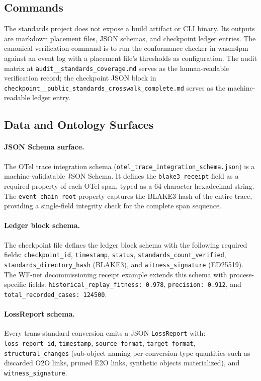 \subsection{Commands}
\label{sec:standards-impl-commands}

The standards project does not expose a build artifact or CLI binary. Its outputs are
markdown placement files, JSON schemas, and checkpoint ledger entries. The canonical
verification command is to run the conformance checker in wasm4pm against an event log
with a placement file's thresholds as configuration. The audit matrix at
\texttt{audit\_\_standards\_coverage.md} serves as the human-readable verification record;
the checkpoint JSON block in \texttt{checkpoint\_\_public\_standards\_crosswalk\_complete.md}
serves as the machine-readable ledger entry.

\subsection{Data and Ontology Surfaces}
\label{sec:standards-impl-data}

\paragraph{JSON Schema surface.}
The OTel trace integration schema (\texttt{otel\_trace\_integration\_schema.json}) is a
machine-validatable JSON Schema. It defines the \texttt{blake3\_receipt} field as a
required property of each OTel span, typed as a 64-character hexadecimal string. The
\texttt{event\_chain\_root} property captures the BLAKE3 hash of the entire trace, providing
a single-field integrity check for the complete span sequence.

\paragraph{Ledger block schema.}
The checkpoint file defines the ledger block schema with the following required fields:
\texttt{checkpoint\_id}, \texttt{timestamp}, \texttt{status}, \texttt{standards\_count\_verified},
\texttt{standards\_directory\_hash} (BLAKE3), and \texttt{witness\_signature} (ED25519).
The WF-net decommissioning receipt example extends this schema with process-specific
fields: \texttt{historical\_replay\_fitness: 0.978}, \texttt{precision: 0.912}, and
\texttt{total\_recorded\_cases: 124500}.

\paragraph{LossReport schema.}
Every trans-standard conversion emits a JSON \texttt{LossReport} with: \texttt{loss\_report\_id},
\texttt{timestamp}, \texttt{source\_format}, \texttt{target\_format}, \texttt{structural\_changes}
(sub-object naming per-conversion-type quantities such as discarded O2O links, pruned
E2O links, synthetic objects materialized), and \texttt{witness\_signature}.

